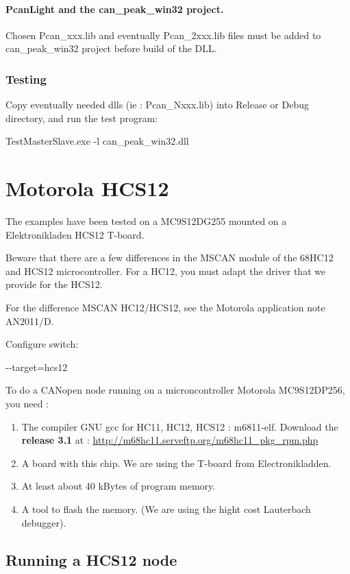 \documentclass[a4paper,12pt]{book}
\newcommand\liststyleLx{%
\renewcommand\labelitemi{{--}}
\renewcommand\labelitemii{{--}}
\renewcommand\labelitemiii{{--}}
\renewcommand\labelitemiv{{--}}
}
\begin{document}
\paragraph{PcanLight and the can\_peak\_win32 project.}
Chosen Pcan\_xxx.lib and eventually Pcan\_2xxx.lib files must be added
to can\_peak\_win32 \space \space project before build of the DLL.

\subsubsection{Testing}
Copy eventually needed dlls (ie : Pcan\_Nxxx.lib) into Release or Debug
directory, and run the test program:

{\ttfamily
TestMasterSlave.exe {}-l can\_peak\_win32.dll}

\section{Motorola HCS12}
The examples have been tested on a MC9S12DG255 mounted on a
Elektronikladen HCS12 T{}-board.

Beware that there are a few differences in the MSCAN module of the
68HC12 and HCS12 microcontroller. For a HC12, you must adapt the driver
that we provide for \space the HCS12.

For the difference MSCAN HC12/HCS12, see the Motorola application note
AN2011/D.

Configure switch:

{\ttfamily
 {}-{}-target=hcs12}

To do a CANopen node running on a microncontroller Motorola MC9S12DP256,
you need :

\liststyleLx
\begin{enumerate}
\item The compiler GNU gcc for HC11, HC12, HCS12 : m6811{}-elf. \newline
Download the \textbf{release 3.1} at :
\space \href{http://m68hc11.serveftp.org/m68hc11_pkg_rpm.php}{http://m68hc11.serveftp.org/m68hc11\_pkg\_rpm.php}

\item A board with this chip. We are using the T{}-board from
Electronikladden. 
\item At least about 40 kBytes of program memory.
\item A tool to flash the memory. (We are using the hight cost
Lauterbach debugger).
\end{enumerate}
\subsection{Running a HCS12 node}
\end{document}

